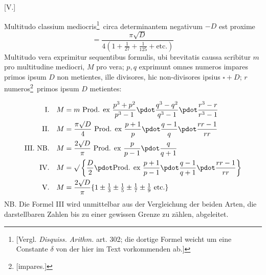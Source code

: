 \par\bigskip{}\centerline{[V.]}\medskip
Multitudo classium mediocris\begingroup\renewcommand{\thefootnote}{*)}\footnote{[Vergl. \emph{Disquiss. Arithm.} art. 302; die dortige Formel weicht um eine Constante $\delta$ von der hier im Text vorkommenden ab.]}\endgroup\ circa determinantem negativum $-D$ est proxime
\[
=\frac{\pi\surd D}{4(1+\tfrac1{27}+\tfrac1{125}+\text{etc.})}
\]
Multitudo vera exprimitur sequentibus formulis, ubi brevitatis caussa scribitur $m$ pro multitudine mediocri, $M$ pro vera; $p,q$ exprimunt omnes numeros impares primos ipsum $D$ non metientes, ille divisores, hic non-divisores ipsius $\square+D$; $r$ numeros\begingroup\renewcommand{\thefootnote}{**)}\footnote{[impares.]}\endgroup\ primos ipsum $D$ metientes:

\[
\begin{aligned}
\text{I.}\quad M&=m\ \text{Prod. ex }\frac{p^3+p^2}{p^3-1}\pdot\frac{q^3-q^2}{q^3-1}\pdot\frac{r^3-r}{r^3-1}\\
\text{II.}\quad M&=\frac{\pi\surd D}4\ \text{Prod. ex }\frac{p+1}p\pdot\frac{q-1}q\pdot\frac{rr-1}{rr}\\
\text{III. NB.}\quad M&=\frac{2\surd D}\pi\ \text{Prod. ex }\frac p{p-1}\pdot\frac q{q+1}\\
\text{IV.}\quad M&=\surd\left\{\frac D2\pdot\text{Prod. ex }\frac{p+1}{p-1}\pdot\frac{q-1}{q+1}\pdot\frac{rr-1}{rr}\right\}\\
\text{V.}\quad M&=\frac{2\surd D}\pi\{1\pm\tfrac13\pm\tfrac15\pm\tfrac17\pm\tfrac19\text{ etc.}\}
\end{aligned}
\]
NB. Die Formel III wird unmittelbar aus der Vergleichung der beiden Arten, die darstellbaren Zahlen bis zu einer gewissen Grenze zu zählen, abgeleitet.
